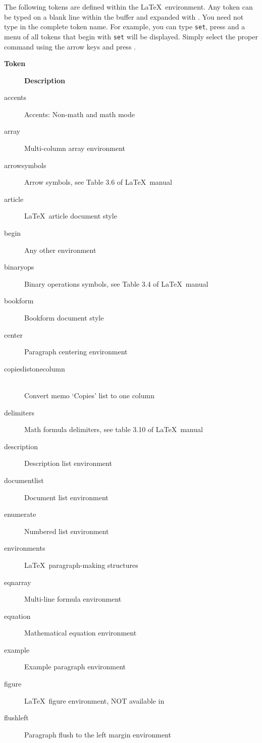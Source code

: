 The following tokens are defined within the \LaTeX\ environment. Any token can
be typed on a blank line within the buffer and expanded with
\nolinebreak. You need not type in the complete token name. For
example, you can type {\tt \bs set}, press  and a menu of all tokens
that begin with {\tt \bs set} will be displayed. Simply select the proper
command using the arrow keys and press \return.

\begin{small}
\begin{description}
\item[\bf Token] {\bf Description}
\item[accents]         Accents: Non-math and math mode
\item[array]           Multi-column array environment
\item[arrow\us symbols]   Arrow symbols, see Table 3.6 of \LaTeX\ manual
\item[article]         \LaTeX\ article document style
\item[begin]           Any other environment
\item[binary\us ops]      Binary operations symbols, see Table 3.4 of \LaTeX\ manual
\item[bookform]        Bookform document style
\item[center]          Paragraph centering environment
\item[copies\us list\us one\us column]  \mbox{} \\
                       Convert memo `Copies' list to one column
\item[delimiters]      Math formula delimiters, see table 3.10 of \LaTeX\ manual
\item[description]     Description list environment
\item[documentlist]    Document list environment
\item[enumerate]       Numbered list environment
\item[environments]    \LaTeX\ paragraph-making structures
\item[eqnarray]        Multi-line formula environment
\item[equation]        Mathematical equation environment
\item[example]         Example paragraph environment
\item[figure]          \LaTeX\ figure environment, NOT available in \SLiTeX
\item[flushleft]       Paragraph flush to the left margin environment

\end{description}
\end{small}
